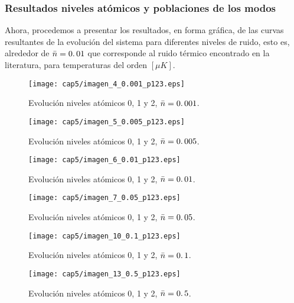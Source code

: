 \subsubsection{Resultados niveles at\'omicos y poblaciones de los modos}
\quad Ahora, procedemos a presentar los resultados, en forma gr\'afica, de las curvas resultantes de la evoluci\'on del sistema para diferentes niveles de ruido, esto es, alrededor de $\bar{n}=0\ldotp 01$ que corresponde al ruido t\'ermico encontrado en la literatura, para temperaturas del orden $[\mu K]$.
\clearpage
\begin{figure}[ht]
\centering
\texttt{[image: cap5/imagen\_4\_0.001\_p123.eps]}\caption{Evoluci\'on niveles at\'omicos 0, 1 y 2, $\bar{n}=0\ldotp 001$.}\label{fig:niveles_123_4_0001}
\texttt{[image: cap5/imagen\_5\_0.005\_p123.eps]}\caption{Evoluci\'on niveles at\'omicos 0, 1 y 2, $\bar{n}=0\ldotp 005$.}\label{fig:niveles_123_5_0005}
\end{figure}
\begin{figure}[ht]
\centering
\texttt{[image: cap5/imagen\_6\_0.01\_p123.eps]}\caption{Evoluci\'on niveles at\'omicos 0, 1 y 2, $\bar{n}=0\ldotp 01$.}\label{fig:niveles_123_6_001}
\texttt{[image: cap5/imagen\_7\_0.05\_p123.eps]}\caption{Evoluci\'on niveles at\'omicos 0, 1 y 2, $\bar{n}=0\ldotp 05$.}\label{fig:niveles_123_7_005}
\end{figure}
\begin{figure}[ht]
\centering
\texttt{[image: cap5/imagen\_10\_0.1\_p123.eps]}\caption{Evoluci\'on niveles at\'omicos 0, 1 y 2, $\bar{n}=0\ldotp 1$.}\label{fig:niveles_123_10_01}
\texttt{[image: cap5/imagen\_13\_0.5\_p123.eps]}\caption{Evoluci\'on niveles at\'omicos 0, 1 y 2, $\bar{n}=0\ldotp 5$.}\label{fig:niveles_123_13_05}
\end{figure}


